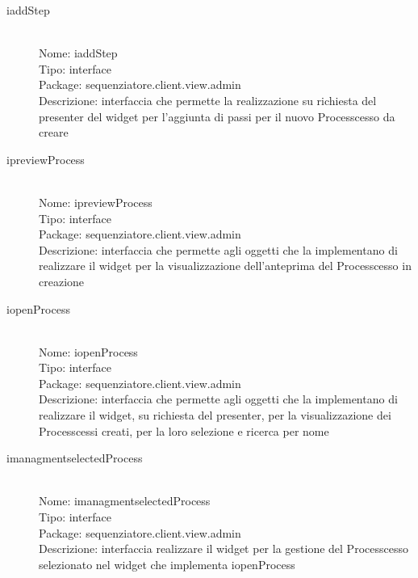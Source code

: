 \begin{description}
	\item[iaddStep] 
  	\hfill \\
  	Nome: iaddStep\\
  	Tipo: interface\\
	Package: sequenziatore.client.view.admin\\
	Descrizione: interfaccia che permette la realizzazione su richiesta del presenter del widget per l'aggiunta di passi per il nuovo Processcesso da creare
\end{description}

\begin{description}
	\item[ipreviewProcess] 
  	\hfill \\
  	Nome: ipreviewProcess\\
  	Tipo: interface\\
	Package: sequenziatore.client.view.admin\\
	Descrizione: interfaccia che permette agli oggetti che la implementano di realizzare il widget per la visualizzazione dell'anteprima del Processcesso in creazione
\end{description}

\begin{description}
	\item[iopenProcess] 
  	\hfill \\
  	Nome: iopenProcess\\
  	Tipo: interface\\
	Package: sequenziatore.client.view.admin\\
	Descrizione: interfaccia che permette agli oggetti che la implementano di realizzare il widget, su richiesta del presenter, per la visualizzazione dei Processcessi creati, per la loro selezione e ricerca per nome
\end{description}

\begin{description}
	\item[imanagmentselectedProcess] 
  	\hfill \\
  	Nome: imanagmentselectedProcess\\
  	Tipo: interface\\
	Package: sequenziatore.client.view.admin\\
	Descrizione: interfaccia realizzare il widget per la gestione del Processcesso selezionato nel widget che implementa iopenProcess
\end{description}

